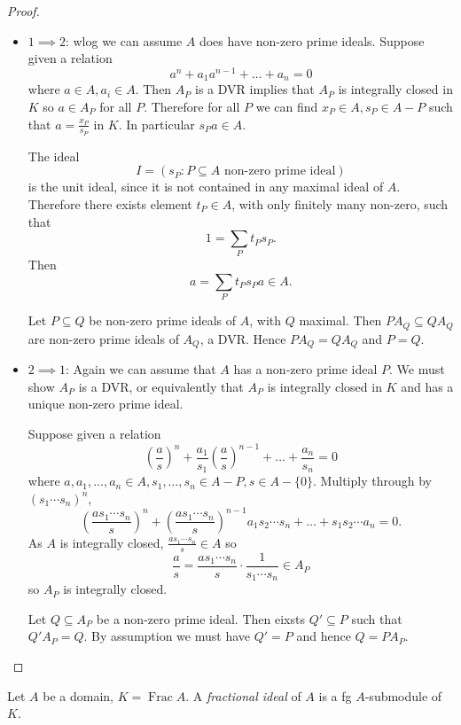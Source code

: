 \documentclass[a4paper]{article}
\DeclareMathOperator{\Frac}{Frac}
\begin{document}
\begin{proof}\leavevmode
  \begin{itemize}
  \item \(1 \implies 2\): wlog we can assume \(A\) does have non-zero prime ideals. Suppose given a relation
    \[
      a^n + a_1 a^{n - 1} + \dots + a_n = 0
    \]
    where \(a \in A, a_i \in A\). Then \(A_P\) is a DVR implies that \(A_P\) is integrally closed in \(K\) so \(a \in A_P\) for all \(P\). Therefore for all \(P\) we can find \(x_P \in A, s_P \in A - P\) such that \(a = \frac{x_P}{s_P}\) in \(K\). In particular \(s_Pa \in A\).

    The ideal
    \[
      I = (s_P: P \subseteq A \text{ non-zero prime ideal})
    \]
    is the unit ideal, since it is not contained in any maximal ideal of \(A\). Therefore there exists element \(t_P \in A\), with only finitely many non-zero, such that
    \[
      1 = \sum_P t_P s_P.
    \]
    Then
    \[
      a = \sum_P t_P s_Pa \in A.
    \]

    Let \(P \subseteq Q\) be non-zero prime ideals of \(A\), with \(Q\) maximal. Then \(PA_Q \subseteq QA_Q\) are non-zero prime ideals of \(A_Q\), a DVR. Hence \(PA_Q = QA_Q\) and \(P = Q\).
  \item \(2 \implies 1\): Again we can assume that \(A\) has a non-zero prime ideal \(P\). We must show \(A_P\) is a DVR, or equivalently that \(A_P\) is integrally closed in \(K\) and has a unique non-zero prime ideal.

    Suppose given a relation
    \[
      \left( \frac{a}{s} \right)^n + \frac{a_1}{s_1} \left( \frac{a}{s} \right)^{n - 1} + \dots + \frac{a_n}{s_n} = 0
    \]
    where \(a, a_1, \dots, a_n \in A, s_1, \dots, s_n \in A - P, s \in A - \{0\}\). Multiply through by \((s_1 \cdots s_n)^n\),
    \[
      \left( \frac{as_1 \cdots s_n}{s} \right)^n + \left( \frac{as_1 \cdots s_n}{s} \right)^{n - 1} a_1 s_2 \cdots s_n + \dots + s_1s_2 \cdots a_n = 0.
    \]
    As \(A\) is integrally closed, \(\frac{as_1 \cdots s_n}{s} \in A\) so
    \[
      \frac{a}{s} = \frac{as_1 \cdots s_n}{s} \cdot \frac{1}{s_1 \cdots s_n} \in A_P
    \]
    so \(A_P\) is integrally closed.

    Let \(Q \subseteq A_P\) be a non-zero prime ideal. Then eixsts \(Q' \subseteq P\) such that \(Q'A_P = Q\). By assumption we must have \(Q' = P\) and hence \(Q = PA_P\).
  \end{itemize}
\end{proof}

\begin{definition}
  Let \(A\) be a domain, \(K = \Frac A\). A \emph{fractional ideal} of \(A\) is a fg \(A\)-submodule of \(K\).
\end{definition}
\end{document}
